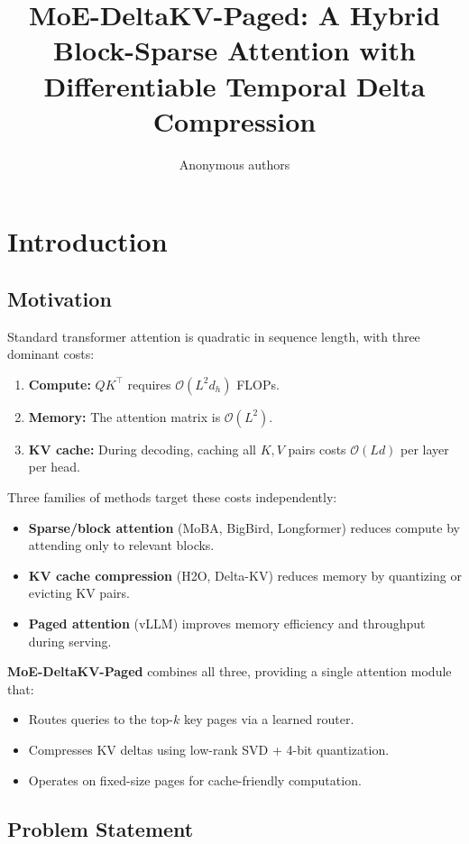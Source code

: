\title{\textbf{MoE-DeltaKV-Paged: A Hybrid Block-Sparse Attention with Differentiable Temporal Delta Compression}}

\author{Anonymous authors}


\section{Introduction}

\subsection{Motivation}

Standard transformer attention is quadratic in sequence length, with three 
dominant costs:

\begin{enumerate}
\item \textbf{Compute:} $QK^\top$ requires $\mathcal{O}(L^2 d_h)$ FLOPs.
\item \textbf{Memory:} The attention matrix is $\mathcal{O}(L^2)$.
\item \textbf{KV cache:} During decoding, caching all $K, V$ pairs costs
  $\mathcal{O}(L d)$ per layer per head.

\end{enumerate}
Three families of methods target these costs independently:

\begin{itemize}
\item \textbf{Sparse/block attention} (MoBA, BigBird, Longformer) reduces compute
  by attending only to relevant blocks.
\item \textbf{KV cache compression} (H2O, Delta-KV) reduces memory by quantizing or
  evicting KV pairs.
\item \textbf{Paged attention} (vLLM) improves memory efficiency and throughput
  during serving.

\end{itemize}
\textbf{MoE-DeltaKV-Paged} combines all three, providing a single attention module 
that:
\begin{itemize}
\item Routes queries to the top-$k$ key pages via a learned router.
\item Compresses KV deltas using low-rank SVD + 4-bit quantization.
\item Operates on fixed-size pages for cache-friendly computation.

\end{itemize}
\subsection{Problem Statement}

